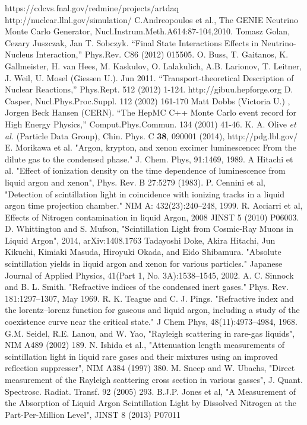 \documentclass[12pt]{elsarticle}
\begin{document}
\begin{thebibliography}{99}

 https://cdcvs.fnal.gov/redmine/projects/artdaq
 http://nuclear.llnl.gov/simulation/
 C.Andreopoulos et al., The GENIE Neutrino Monte Carlo Generator, Nucl.Instrum.Meth.A614:87-104,2010.
 Tomasz Golan, Cezary Juszczak, Jan T. Sobczyk. ``Final State Interactions Effects in Neutrino-Nucleus Interaction,'' Phys.Rev. C86 (2012) 015505.
 O. Buss, T. Gaitanos, K. Gallmeister, H. van Hees, M. Kaskulov, O. Lalakulich, A.B. Larionov, T. Leitner, J. Weil, U. Mosel (Giessen U.). Jun 2011. ``Transport-theoretical Description of Nuclear Reactions,'' Phys.Rept. 512 (2012) 1-124. http://gibuu.hepforge.org
 D. Casper, Nucl.Phys.Proc.Suppl. 112 (2002) 161-170
 Matt Dobbs (Victoria U.) , Jorgen Beck Hansen (CERN). ``The HepMC C++ Monte Carlo event record for High Energy Physics,'' Comput.Phys.Commun. 134 (2001) 41-46.
 K. A. Olive {\it et al.} (Particle Data Group), Chin. Phys. C {\bf 38}, 090001 (2014), http://pdg.lbl.gov/
 E. Morikawa et al. "Argon, krypton, and xenon excimer luminescence: From the dilute gas to the condensed phase." J. Chem. Phys, 91:1469, 1989.
 A Hitachi et al. "Effect of ionization density on the time dependence of luminescence from liquid argon and xenon", Phys. Rev. B 27:5279 (1983). P. Cennini et al, "Detection of scintillation light in coincidence with ionizing tracks in a liquid argon time projection chamber." NIM A: 432(23):240–248, 1999.  R. Acciarri et al, Effects of Nitrogen contamination in liquid Argon, 2008 JINST 5 (2010) P06003.  D. Whittington and S. Mufson, "Scintillation Light from Cosmic-Ray Muons in Liquid Argon", 2014, arXiv:1408.1763
 Tadayoshi Doke, Akira Hitachi, Jun Kikuchi, Kimiaki Masuda, Hiroyuki Okada, and Eido Shibamura. "Absolute scintillation yields in liquid argon and xenon for various particles." Japanese Journal of Applied Physics, 41(Part 1, No. 3A):1538–1545, 2002.
 A. C. Sinnock and B. L. Smith. "Refractive indices of the condensed inert gases." Phys. Rev. 181:1297–1307, May 1969.   R. K. Teague and C. J. Pings. "Refractive index and the lorentz–lorenz function for gaseous and liquid argon, including a study of the coexistence curve near the critical state." J Chem Phys, 48(11):4973–4984, 1968.
 G.M. Seidel, R.E. Lanou, and W. Yao, "Rayleigh scattering in rare-gas liquids", NIM A489 (2002) 189.   N. Ishida et al., "Attenuation length measurements of scintillation light in liquid rare gases and their mixtures using an improved reflection suppresser", NIM A384 (1997) 380. M. Sneep and W. Ubachs, "Direct measurement of the Rayleigh scattering cross section in various gasses", J. Quant. Spectrosc. Radiat. Transf. 92 (2005) 293.
 B.J.P. Jones et al, "A Measurement of the Absorption of Liquid Argon Scintillation Light by Dissolved Nitrogen at the Part-Per-Million Level", JINST 8 (2013) P07011


\end{thebibliography}
\end{document}
